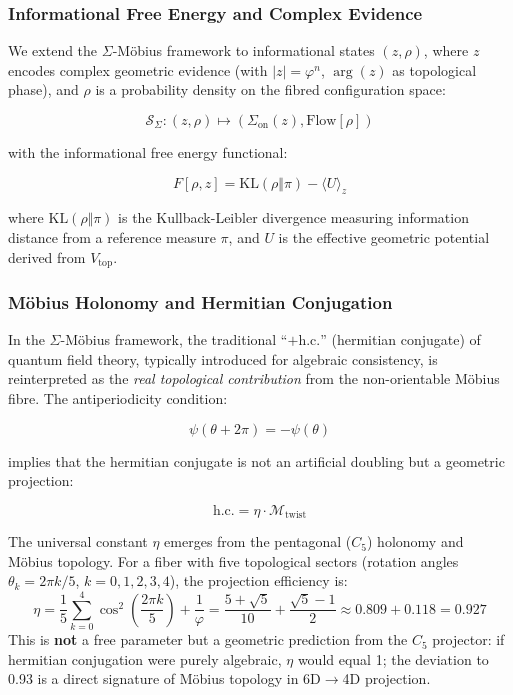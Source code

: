 \documentclass[12pt]{article}
\theoremstyle{definition}
\theoremstyle{plain}
\begin{document}
\subsubsection{Informational Free Energy and Complex Evidence}

We extend the $\Sigma$-M\"obius framework to informational states $(z, \rho)$, where $z$ encodes complex geometric evidence (with $|z| = \varphi^n$, $\arg(z)$ as topological phase), and $\rho$ is a probability density on the fibred configuration space:

\begin{equation}
\mathscr{S}_{\Sigma} : (z, \rho) \mapsto (\Sigma_{\text{on}}(z), \text{Flow}[\rho])
\end{equation}

with the informational free energy functional:

\begin{equation}
F[\rho, z] = \mathrm{KL}(\rho \Vert \pi) - \langle U \rangle_z
\end{equation}

where $\mathrm{KL}(\rho \Vert \pi)$ is the Kullback-Leibler divergence measuring information distance from a reference measure $\pi$, and $U$ is the effective geometric potential derived from $V_{\text{top}}$.

\subsubsection{M\"obius Holonomy and Hermitian Conjugation}

In the $\Sigma$-M\"obius framework, the traditional ``$+ \text{h.c.}$'' (hermitian conjugate) of quantum field theory, typically introduced for algebraic consistency, is reinterpreted as the \textit{real topological contribution} from the non-orientable M\"obius fibre. The antiperiodicity condition:

\begin{equation}
\psi(\theta+2\pi) = -\psi(\theta)
\end{equation}

implies that the hermitian conjugate is not an artificial doubling but a geometric projection:

\begin{equation}
\text{h.c.} = \eta \cdot \mathcal{M}_{\text{twist}}
\end{equation}

The universal constant $\eta$ emerges from the pentagonal ($C_5$) holonomy and M\"obius topology. For a fiber with five topological sectors (rotation angles $\theta_k = 2\pi k/5$, $k=0,1,2,3,4$), the projection efficiency is:
\begin{equation}
\eta = \frac{1}{5}\sum_{k=0}^{4} \cos^2\left(\frac{2\pi k}{5}\right) + \frac{1}{\varphi} = \frac{5 + \sqrt{5}}{10} + \frac{\sqrt{5}-1}{2} \approx 0.809 + 0.118 = 0.927
\end{equation}
This is \textbf{not} a free parameter but a geometric prediction from the $C_5$ projector: if hermitian conjugation were purely algebraic, $\eta$ would equal 1; the deviation to 0.93 is a direct signature of M\"obius topology in 6D$\to$4D projection.
\end{document}
